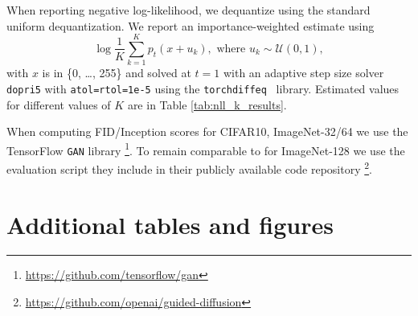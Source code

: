 \documentclass{article}
\def\ra{{\textnormal{a}}}
\def\gU{{\mathcal{U}}}
\renewcommand{\ra}[1]{\renewcommand{\arraystretch}{#1}}
\begin{document}
When reporting negative log-likelihood, we dequantize using the standard uniform dequantization. We report an importance-weighted estimate using
\begin{equation}
    \log \frac{1}{K} \sum_{k=1}^K p_t (x + u_k), \text{ where } u_k \sim \gU(0, 1),
\end{equation}
with $x$ is in \{0, \dots, 255\} and solved at $t=1$ with an adaptive step size solver \texttt{dopri5} with \texttt{atol=rtol=1e-5} using the \texttt{torchdiffeq}~\citep{torchdiffeq} library. Estimated values for different values of $K$ are in Table \ref{tab:nll_k_results}.

When computing FID/Inception scores for CIFAR10, ImageNet-32/64 we use the TensorFlow \lstinline{GAN} library \footnote{\url{https://github.com/tensorflow/gan}}.  To remain comparable to \cite{dhariwal2021diffusion} for ImageNet-128 we use the evaluation script they include in their publicly available code repository \footnote{\url{https://github.com/openai/guided-diffusion}}.



\section{Additional tables and figures}

\begin{table}\centering
\ra{1.2}
\setlength{\tabcolsep}{2.5pt}
\caption{Negative log-likelihood (in bits per dimension) on the test set with different values of $K$ using uniform dequantization. }
\label{tab:nll_k_results}
\end{table}
\end{document}
